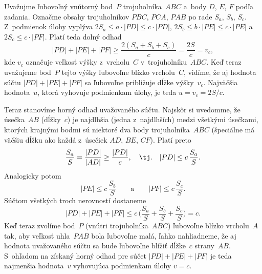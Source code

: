 {%
Uvažujme ľubovoľný vnútorný bod~$P$ trojuholníka~$ABC$ a~body $D$,
$E$, $F$ podľa zadania. Označme obsahy trojuholníkov $PBC$, $PCA$,
$PAB$ po rade $S_a$, $S_b$, $S_c$. Z~podmienok úlohy vyplýva
$2S_a\leq a\cdot |PD|\leq c\cdot |PD|$, $2S_b\leq b\cdot |PE|\leq
c\cdot |PE|$ a~$2S_c\leq c\cdot |PF|$. Platí teda dolný odhad
$$
|PD|+|PE|+|PF|\geq \frac{2(S_a+S_b+S_c)}{c}=\frac{2S}{c}=v_c,
$$
kde $v_c$ označuje veľkosť výšky z~vrcholu~$C$ v~trojuholníku~$ABC$.
Keď teraz uvažujeme bod~$P$ tejto výšky ľubovoľne blízko
vrcholu~$C$, vidíme, že aj hodnota súčtu $|PD|+|PE|+|PF|$ sa
ľubovoľne približuje dĺžke výšky~$v_c$. Najväčšia hodnota~$u$,
ktorá vyhovuje podmienkam úlohy, je teda $u=v_c=2S/c$.

\smallskip
Teraz stanovíme horný odhad uvažovaného súčtu. Najskôr si
uvedomme, že úsečka~$AB$ (dĺžky~$c$) je najdlhšia (jedna
z~najdlhších) medzi všetkými úsečkami, ktorých krajnými bodmi sú
niektoré dva body trojuholníka~$ABC$ (špeciálne má väčšiu
dĺžku ako každá z~úsečiek $AD$, $BE$, $CF$). Platí preto
$$
\frac{S_a}{S}=\frac{|PD|}{|AD|}\geq \frac{|PD|}{c},\quad \text{\tj.}
    \quad |PD|\leq c\,\frac{S_a}{S}.
$$
Analogicky potom
$$
|PE|\leq c\,\frac{S_b}{S} \qquad \text{a} \qquad
    |PF|\leq c\,\frac{S_c}{S}.
$$
Súčtom všetkých troch nerovností dostaneme
$$
|PD|+|PE|+|PF|\leq c\,\bigg(\frac{S_a}{S}+\frac{S_b}{S}+
                  \frac{S_c}{S}\bigg)=c.
$$
Keď teraz zvolíme bod~$P$ (vnútri trojuholníka~$ABC$) ľubovoľne
blízko vrcholu~$A$ tak, aby veľkosť uhla~$PAB$ bola ľubovoľne
malá, ľahko nahliadneme, že aj hodnota uvažovaného súčtu sa bude
ľubovoľne blížiť dĺžke~$c$ strany~$AB$. S~ohľadom na získaný horný
odhad pre súčet $|PD|+|PE|+|PF|$ je teda najmenšia hodnota~$v$
vyhovujúca podmienkam úlohy $v=c$.}

